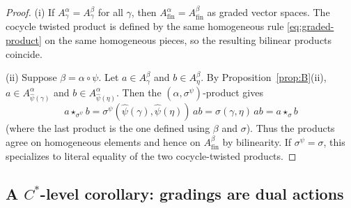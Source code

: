 \documentclass[11pt]{amsart}
\theoremstyle{plain}
\theoremstyle{definition}
\theoremstyle{remark}
\begin{document}
\begin{proof}
(i) If $A_\gamma^\alpha=A_\gamma^\beta$ for all $\gamma$, then $A_{\mathrm{fin}}^\alpha=A_{\mathrm{fin}}^\beta$ as graded vector spaces.
The cocycle twisted product is defined by the same homogeneous rule \eqref{eq:graded-product} on the same homogeneous pieces,
so the resulting bilinear products coincide.

(ii) Suppose $\beta=\alpha\circ\psi$. Let $a\in A_\gamma^\beta$ and $b\in A_\eta^\beta$.
By Proposition~\ref{prop:B}(ii), $a\in A_{\widehat\psi(\gamma)}^\alpha$ and $b\in A_{\widehat\psi(\eta)}^\alpha$.
Then the $(\alpha,\sigma^\psi)$-product gives
\[
a\star_{\sigma^\psi} b
=\sigma^\psi(\widehat\psi(\gamma),\widehat\psi(\eta))\,ab
=\sigma(\gamma,\eta)\,ab
=a\star_\sigma b
\]
(where the last product is the one defined using $\beta$ and $\sigma$).
Thus the products agree on homogeneous elements and hence on $A_{\mathrm{fin}}^\beta$ by bilinearity.
If $\sigma^\psi=\sigma$, this specializes to literal equality of the two cocycle-twisted products.
\end{proof}
\subsection{A $C^*$-level corollary: gradings are dual actions}\label{subsec:Cstar-grading}
\end{document}
